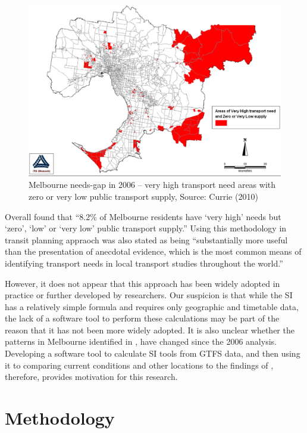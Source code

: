 \documentclass[preprint, 3p,
authoryear]{elsarticle} %
\begin{document}
\begin{figure}
\includegraphics[width=1\linewidth]{graphics/Currie2010gap} \caption{Melbourne needs-gap in 2006 – very high transport need areas with zero or very low public transport supply, Source: Currie (2010)}\label{fig:Currie_map_gap}
\end{figure}

Overall \citet{currie2010identifying} found that ``8.2\% of Melbourne
residents have `very high' needs but `zero', `low' or `very low' public
transport supply.'' Using this methodology in transit planning appraoch
was also stated as being ``substantially more useful than the
presentation of anecdotal evidence, which is the most common means of
identifying transport needs in local transport studies throughout the
world.''\citep{currie2010identifying}

However, it does not appear that this approach has been widely adopted
in practice or further developed by researchers. Our suspicion is that
while the SI has a relatively simple formula and requires only
geographic and timetable data, the lack of a software tool to perform
these calculations may be part of the reason that it has not been more
widely adopted. It is also unclear whether the patterns in Melbourne
identified in \citet{currie2010identifying}, have changed since the 2006
analysis. Developing a software tool to calculate SI tools from GTFS
data, and then using it to comparing current conditions and other
locations to the findings of \citet{currie2010identifying}, therefore,
provides motivation for this research.

\section{Methodology}\label{methodology}
\end{document}

